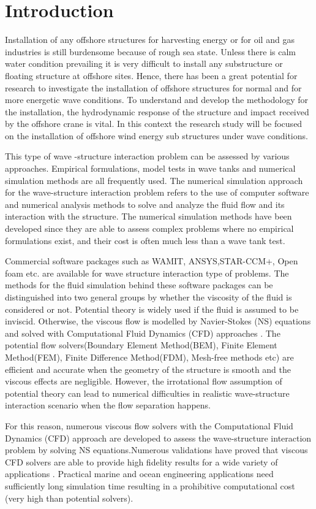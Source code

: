 \documentclass[preprint,12pt]{article}
\begin{document}
{\selectfont


\section{Introduction}
 Installation of any offshore structures for harvesting energy or for oil and gas industries is still burdensome because of rough sea state. Unless there is calm water condition prevailing it is very difficult to install any substructure or floating structure at offshore sites. Hence, there has been a great potential for research to investigate the installation of offshore structures for normal and for more energetic wave conditions. To understand and develop the methodology for the installation, the hydrodynamic response of the structure and impact received by the offshore crane is vital. In this context the research study will be  focused on the installation of offshore wind energy sub structures under wave conditions.
\par
This type of  wave -structure interaction problem can be assessed by various approaches. Empirical formulations, model tests in wave tanks and numerical simulation methods are all frequently used. The numerical simulation approach for the wave-structure interaction problem refers to the use of computer software and numerical analysis methods to solve and analyze the fluid flow and its interaction with the structure. The numerical simulation methods have been developed since they are able to assess complex problems where no empirical formulations exist, and their cost is often much less than a wave tank test. \par
Commercial software packages such as WAMIT, ANSYS,STAR-CCM+, Open foam etc. are available for wave structure interaction type of problems. The methods for the fluid simulation behind these software packages can be distinguished into two general groups by whether the viscosity of the fluid is considered or not. Potential theory is widely used if the fluid is assumed to be inviscid. Otherwise, the viscous flow is modelled by Navier-Stokes (NS) equations and solved with Computational Fluid Dynamics (CFD) approaches . 
The potential flow solvers(Boundary Element Method(BEM), Finite Element Method(FEM), Finite Difference Method(FDM), Mesh-free methods etc) are efficient and accurate when the geometry of the structure is smooth and the viscous effects are negligible. However, the irrotational flow assumption of potential theory can lead to numerical difficulties in realistic wave-structure interaction scenario when the flow separation happens. \par
For this reason, numerous viscous flow solvers with the Computational Fluid Dynamics (CFD) approach are developed to assess the wave-structure interaction problem by solving NS equations.Numerous validations have proved that viscous CFD solvers are able to provide high fidelity results for a wide variety of applications . Practical marine and ocean engineering applications need sufficiently long simulation time resulting in a prohibitive computational cost (very high than potential solvers). \par
 
}
\end{document}
